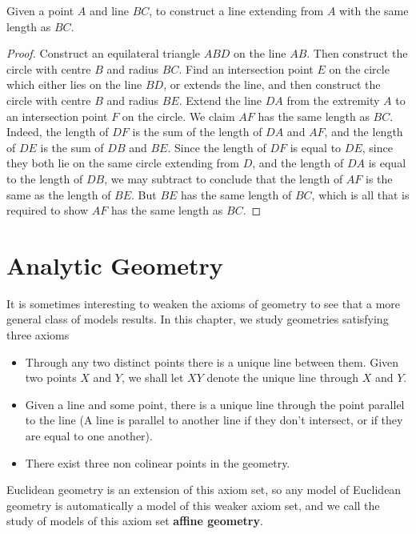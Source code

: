 \begin{theorem}
    Given a point $A$ and line $BC$, to construct a line extending from $A$ with the same length as $BC$.
\end{theorem}
\begin{proof}
    Construct an equilateral triangle $ABD$ on the line $AB$. Then construct the circle with centre $B$ and radius $BC$. Find an intersection point $E$ on the circle which either lies on the line $BD$, or extends the line, and then construct the circle with centre $B$ and radius $BE$. Extend the line $DA$ from the extremity $A$ to an intersection point $F$ on the circle. We claim $AF$ has the same length as $BC$. Indeed, the length of $DF$ is the sum of the length of $DA$ and $AF$, and the length of $DE$ is the sum of $DB$ and $BE$. Since the length of $DF$ is equal to $DE$, since they both lie on the same circle extending from $D$, and the length of $DA$ is equal to the length of $DB$, we may subtract to conclude that the length of $AF$ is the same as the length of $BE$. But $BE$ has the same length of $BC$, which is all that is required to show $AF$ has the same length as $BC$.
\end{proof}

\chapter{Analytic Geometry}

It is sometimes interesting to weaken the axioms of geometry to see that a more general class of models results. In this chapter, we study geometries satisfying three axioms
%
\begin{itemize}
    \item Through any two distinct points there is a unique line between them. Given two points $X$ and $Y$, we shall let $XY$ denote the unique line through $X$ and $Y$.
    \item Given a line and some point, there is a unique line through the point parallel to the line (A line is parallel to another line if they don't intersect, or if they are equal to one another).
    \item There exist three non colinear points in the geometry.
\end{itemize}
%
Euclidean geometry is an extension of this axiom set, so any model of Euclidean geometry is automatically a model of this weaker axiom set, and we call the study of models of this axiom set {\bf affine geometry}.

